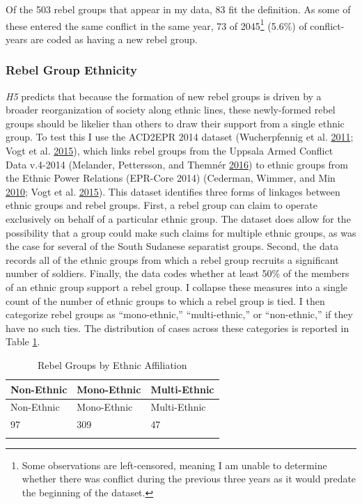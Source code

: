 \documentclass[12pt,]{book}
\let\rmarkdownfootnote\footnote%
\def\footnote{\protect\rmarkdownfootnote}
\theoremstyle{definition}
\theoremstyle{definition}
\theoremstyle{definition}
\theoremstyle{remark}
\begin{document}
Of the 503 rebel groups that appear in my data, 83 fit the definition.
As some of these entered the same conflict in the same year, 73 of
2045\footnote{Some observations are left-censored, meaning I am unable
  to determine whether there was conflict during the previous three
  years as it would predate the beginning of the dataset.} (5.6\%) of
conflict-years are coded as having a new rebel group.

\hypertarget{rebel-group-ethnicity}{%
\subsubsection*{Rebel Group Ethnicity}\label{rebel-group-ethnicity}}

\emph{H5} predicts that because the formation of new rebel groups is
driven by a broader reorganization of society along ethnic lines, these
newly-formed rebel groups should be likelier than others to draw their
support from a single ethnic group. To test this I use the ACD2EPR 2014
dataset (Wucherpfennig et al.
\protect\hyperlink{ref-Wucherpfennig2011}{2011}; Vogt et al.
\protect\hyperlink{ref-Vogt2015}{2015}), which links rebel groups from
the Uppsala Armed Conflict Data v.4-2014 (Melander, Pettersson, and
Themnér \protect\hyperlink{ref-Melander2016}{2016}) to ethnic groups
from the Ethnic Power Relations (EPR-Core 2014) (Cederman, Wimmer, and
Min \protect\hyperlink{ref-Cederman2010}{2010}; Vogt et al.
\protect\hyperlink{ref-Vogt2015}{2015}). This dataset identifies three
forms of linkages between ethnic groups and rebel groups. First, a rebel
group can claim to operate exclusively on behalf of a particular ethnic
group. The dataset does allow for the possibility that a group could
make such claims for multiple ethnic groups, as was the case for several
of the South Sudanese separatist groups. Second, the data records all of
the ethnic groups from which a rebel group recruits a significant number
of soldiers. Finally, the data codes whether at least 50\% of the
members of an ethnic group support a rebel group. I collapse these
measures into a single count of the number of ethnic groups to which a
rebel group is tied. I then categorize rebel groups as ``mono-ethnic,''
``multi-ethnic,'' or ``non-ethnic,'' if they have no such ties. The
distribution of cases across these categories is reported in Table
\ref{tab:acd2epr}.

\begin{longtable}[]{@{}lll@{}}
\tabularnewline
\toprule
Non-Ethnic & Mono-Ethnic & Multi-Ethnic\tabularnewline
\midrule
\endfirsthead
\toprule
Non-Ethnic & Mono-Ethnic & Multi-Ethnic\tabularnewline
\midrule
\endhead
97 & 309 & 47\tabularnewline
\bottomrule
\caption{\label{tab:acd2epr} Rebel Groups by Ethnic
Affiliation}
\end{longtable}
\end{document}
